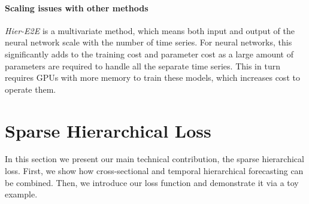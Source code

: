 \documentclass[preprint, 3p, times, twocolumn]{elsarticle}
\begin{document}
\paragraph{Scaling issues with other methods} \label{sec:scalingissuesneuralmethods} \textit{Hier-E2E} \cite{rangapuram_endtoend_2021} is a multivariate method, which means both input and output of the neural network scale with the number of time series. For neural networks, this significantly adds to the training cost and parameter cost as a large amount of parameters are required to handle all the separate time series. This in turn requires GPUs with more memory to train these models, which increases cost to operate them. 

\section{Sparse Hierarchical Loss} \label{sec:sparsehloss}
In this section we present our main technical contribution, the sparse hierarchical loss. First, we show how cross-sectional and temporal hierarchical forecasting can be combined. Then, we introduce our loss function and demonstrate it via a toy example.
\end{document}
